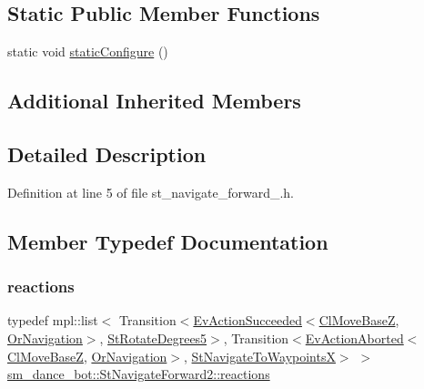 \subsection*{Static Public Member Functions}
\begin{DoxyCompactItemize}
\item 
static void \hyperlink{structsm__dance__bot_1_1StNavigateForward2_a58d2a866ecf79f736d9fa54784c71ea8}{static\+Configure} ()
\end{DoxyCompactItemize}
\subsection*{Additional Inherited Members}


\subsection{Detailed Description}


Definition at line 5 of file st\+\_\+navigate\+\_\+forward\+\_.\+h.



\subsection{Member Typedef Documentation}
\mbox{\label{structsm__dance__bot_1_1StNavigateForward2_ac9a6d0e0aa772d68bcb6d7932a21463a}} 
\subsubsection{\texorpdfstring{reactions}{reactions}}
{\footnotesize\ttfamily typedef mpl\+::list$<$ Transition$<$\hyperlink{structsmacc_1_1default__events_1_1EvActionSucceeded}{Ev\+Action\+Succeeded}$<$\hyperlink{classcl__move__base__z_1_1ClMoveBaseZ}{Cl\+Move\+BaseZ}, \hyperlink{classsm__dance__bot_1_1OrNavigation}{Or\+Navigation}$>$, \hyperlink{structsm__dance__bot_1_1StRotateDegrees5}{St\+Rotate\+Degrees5}$>$, Transition$<$\hyperlink{structsmacc_1_1default__events_1_1EvActionAborted}{Ev\+Action\+Aborted}$<$\hyperlink{classcl__move__base__z_1_1ClMoveBaseZ}{Cl\+Move\+BaseZ}, \hyperlink{classsm__dance__bot_1_1OrNavigation}{Or\+Navigation}$>$, \hyperlink{structsm__dance__bot_1_1StNavigateToWaypointsX}{St\+Navigate\+To\+WaypointsX}$>$ $>$ \hyperlink{structsm__dance__bot_1_1StNavigateForward2_ac9a6d0e0aa772d68bcb6d7932a21463a}{sm\+\_\+dance\+\_\+bot\+::\+St\+Navigate\+Forward2\+::reactions}}



